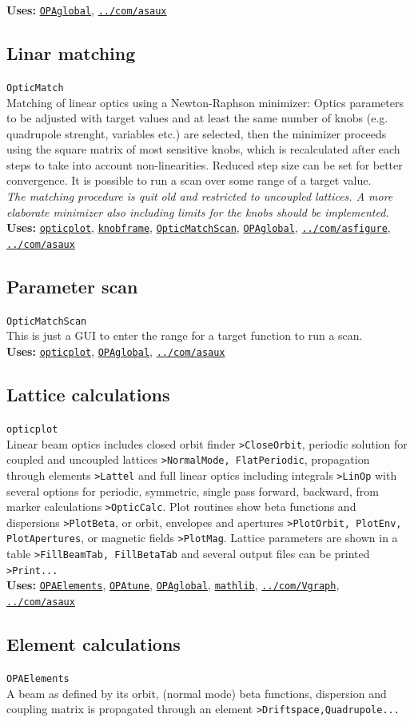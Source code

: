 \documentclass[12pt]{article}
\newcommand\code[1]{{\tt #1}}
\newcommand{\opagui}[1]{\colorbox{blue!20}{\code{#1}}}
\newcommand{\oguih}[2]{\subsection{\label{#2}#1}{\Huge\opagui{#2}}\\}
\newcommand{\ogui}[1]{\hyperref[#1]{\opagui{#1}}}
\newcommand{\opaguif}[1]{\colorbox{violet!30}{\code{#1}}}
\newcommand{\oguif}[1]{\hyperref[#1]{\opaguif{#1}}}
\newcommand{\opauni}[1]{\colorbox{orange!30}{\code{#1}}}
\newcommand{\ounih}[2]{\subsection{\label{#2}#1}{\Huge\opauni{#2}}\\}
\newcommand{\ouni}[1]{\hyperref[#1]{\opauni{#1}}}
\newcommand{\uses}[1]{{\bf Uses: } #1}
\newcommand{\todo}[1]{{\color{red}\em #1}}
\begin{document}
\uses{\ouni{OPAglobal}, \ouni{../com/asaux}} 



\oguih{Linar matching}{OpticMatch} 

Matching of linear optics using a Newton-Raphson minimizer: Optics parameters to be adjusted with target values and at least the same number of knobs (e.g. quadrupole strenght, variables etc.) are selected, then the minimizer proceeds using the square matrix of most sensitive knobs, which is recalculated after each steps to take into account non-linearities. Reduced step size can be set for better convergence. It is possible to run a scan over some range of a target value.\\
\todo{The matching procedure is quit old and restricted to uncoupled lattices. A more elaborate minimizer also including limits for the knobs should be implemented.}\\


\uses{\ouni{opticplot}, \oguif{knobframe}, \ogui{OpticMatchScan}, \ouni{OPAglobal},  \oguif{../com/asfigure}, \ouni{../com/asaux}} 

\oguih{Parameter scan}{OpticMatchScan}
This is just a GUI to enter the range for a target function to run a scan.\\

\uses{\ouni{opticplot}, \ouni{OPAglobal}, \ouni{../com/asaux}} 


\ounih{Lattice calculations}{opticplot} 

Linear beam optics includes closed orbit finder \code{>CloseOrbit}, periodic solution for coupled and uncoupled lattices \code{>NormalMode, FlatPeriodic}, propagation through elements \code{>Lattel} and full linear optics including integrals \code{>LinOp} with several options for periodic, symmetric, single pass forward, backward, from marker calculations \code{>OpticCalc}. Plot routines show beta functions and dispersions \code{>PlotBeta}, or orbit, envelopes and apertures \code{>PlotOrbit, PlotEnv, PlotApertures}, or magnetic fields \code{>PlotMag}. Lattice parameters are shown in a table \code{>FillBeamTab, FillBetaTab} and several output files can be printed \code{>Print...}\\



\uses{
 \ouni{OPAElements}, \ogui{OPAtune}, \ouni{OPAglobal}, \ouni{mathlib}, \oguif{../com/Vgraph}, \ouni{../com/asaux}}

\ounih{Element calculations}{OPAElements} 

A beam as defined by its orbit, (normal mode) beta functions, dispersion and coupling matrix is propagated through an element \code{>Driftspace,Quadrupole...}
\end{document}
